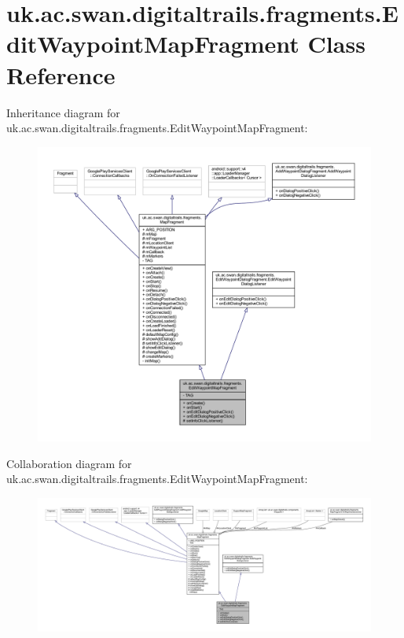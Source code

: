 \hypertarget{classuk_1_1ac_1_1swan_1_1digitaltrails_1_1fragments_1_1_edit_waypoint_map_fragment}{\section{uk.\+ac.\+swan.\+digitaltrails.\+fragments.\+Edit\+Waypoint\+Map\+Fragment Class Reference}
\label{classuk_1_1ac_1_1swan_1_1digitaltrails_1_1fragments_1_1_edit_waypoint_map_fragment}
}


Inheritance diagram for uk.\+ac.\+swan.\+digitaltrails.\+fragments.\+Edit\+Waypoint\+Map\+Fragment\+:
\nopagebreak
\begin{figure}[H]
\begin{center}
\leavevmode
\includegraphics[width=350pt]{classuk_1_1ac_1_1swan_1_1digitaltrails_1_1fragments_1_1_edit_waypoint_map_fragment__inherit__graph}
\end{center}
\end{figure}


Collaboration diagram for uk.\+ac.\+swan.\+digitaltrails.\+fragments.\+Edit\+Waypoint\+Map\+Fragment\+:
\nopagebreak
\begin{figure}[H]
\begin{center}
\leavevmode
\includegraphics[width=350pt]{classuk_1_1ac_1_1swan_1_1digitaltrails_1_1fragments_1_1_edit_waypoint_map_fragment__coll__graph}
\end{center}
\end{figure}
